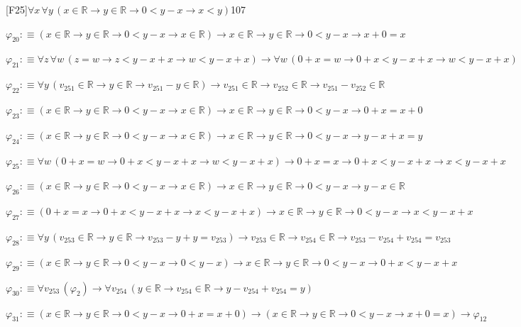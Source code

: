 \begin{fullproof}{[F25]}{$\forall x\,\forall y\,(x \in \mathbb{R} \to y \in \mathbb{R} \to 0 < y - x \to x < y)$}{107}
\begin{abbrevlist}
\item $\varphi_{20} :\equiv (x \in \mathbb{R} \to y \in \mathbb{R} \to 0 < y - x \to x \in \mathbb{R}) \to x \in \mathbb{R} \to y \in \mathbb{R} \to 0 < y - x \to x + 0 = x$
\item $\varphi_{21} :\equiv \forall z\,\forall w\,(z = w \to z < y - x + x \to w < y - x + x) \to \forall w\,(0 + x = w \to 0 + x < y - x + x \to w < y - x + x)$
\item $\varphi_{22} :\equiv \forall y\,(v_{251} \in \mathbb{R} \to y \in \mathbb{R} \to v_{251} - y \in \mathbb{R}) \to v_{251} \in \mathbb{R} \to v_{252} \in \mathbb{R} \to v_{251} - v_{252} \in \mathbb{R}$
\item $\varphi_{23} :\equiv (x \in \mathbb{R} \to y \in \mathbb{R} \to 0 < y - x \to x \in \mathbb{R}) \to x \in \mathbb{R} \to y \in \mathbb{R} \to 0 < y - x \to 0 + x = x + 0$
\item $\varphi_{24} :\equiv (x \in \mathbb{R} \to y \in \mathbb{R} \to 0 < y - x \to x \in \mathbb{R}) \to x \in \mathbb{R} \to y \in \mathbb{R} \to 0 < y - x \to y - x + x = y$
\item $\varphi_{25} :\equiv \forall w\,(0 + x = w \to 0 + x < y - x + x \to w < y - x + x) \to 0 + x = x \to 0 + x < y - x + x \to x < y - x + x$
\item $\varphi_{26} :\equiv (x \in \mathbb{R} \to y \in \mathbb{R} \to 0 < y - x \to x \in \mathbb{R}) \to x \in \mathbb{R} \to y \in \mathbb{R} \to 0 < y - x \to y - x \in \mathbb{R}$
\item $\varphi_{27} :\equiv (0 + x = x \to 0 + x < y - x + x \to x < y - x + x) \to x \in \mathbb{R} \to y \in \mathbb{R} \to 0 < y - x \to x < y - x + x$
\item $\varphi_{28} :\equiv \forall y\,(v_{253} \in \mathbb{R} \to y \in \mathbb{R} \to v_{253} - y + y = v_{253}) \to v_{253} \in \mathbb{R} \to v_{254} \in \mathbb{R} \to v_{253} - v_{254} + v_{254} = v_{253}$
\item $\varphi_{29} :\equiv (x \in \mathbb{R} \to y \in \mathbb{R} \to 0 < y - x \to 0 < y - x) \to x \in \mathbb{R} \to y \in \mathbb{R} \to 0 < y - x \to 0 + x < y - x + x$
\item $\varphi_{30} :\equiv \forall v_{253}\,(\varphi_{2}) \to \forall v_{254}\,(y \in \mathbb{R} \to v_{254} \in \mathbb{R} \to y - v_{254} + v_{254} = y)$
\item $\varphi_{31} :\equiv (x \in \mathbb{R} \to y \in \mathbb{R} \to 0 < y - x \to 0 + x = x + 0) \to (x \in \mathbb{R} \to y \in \mathbb{R} \to 0 < y - x \to x + 0 = x) \to \varphi_{12}$

\end{abbrevlist}
\end{fullproof}
